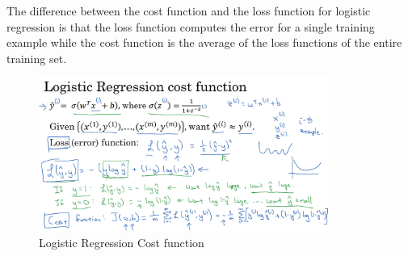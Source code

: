 \documentclass[letterpaper,12pt,notitlepage,twoside]{report}
\begin{document}
\begin{example}
     The difference between the cost function and the loss function for logistic regression is that the loss function computes the error for a single training example while the cost function is the average of the loss functions of the entire training set. 
\end{example}

\begin{figure}[h]
	\centering
	\includegraphics[width=0.85\textwidth]{Images/Cost function.png}
	\caption{Logistic Regression Cost function}
	\label{fig:7}
\end{figure}
\FloatBarrier
\end{document}
